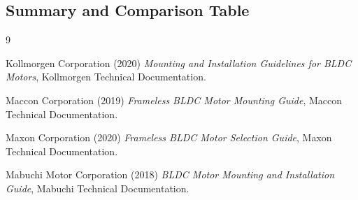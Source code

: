 \documentclass[internal]{../../../classes/nervtech-research}
\begin{document}
\subsection{Summary and Comparison Table}


\clearpage

\begin{thebibliography}{9}

Kollmorgen Corporation (2020) \emph{Mounting and Installation Guidelines for BLDC Motors}, Kollmorgen Technical Documentation.

Maccon Corporation (2019) \emph{Frameless BLDC Motor Mounting Guide}, Maccon Technical Documentation.

Maxon Corporation (2020) \emph{Frameless BLDC Motor Selection Guide}, Maxon Technical Documentation.

Mabuchi Motor Corporation (2018) \emph{BLDC Motor Mounting and Installation Guide}, Mabuchi Technical Documentation.

\end{thebibliography}
\end{document}
